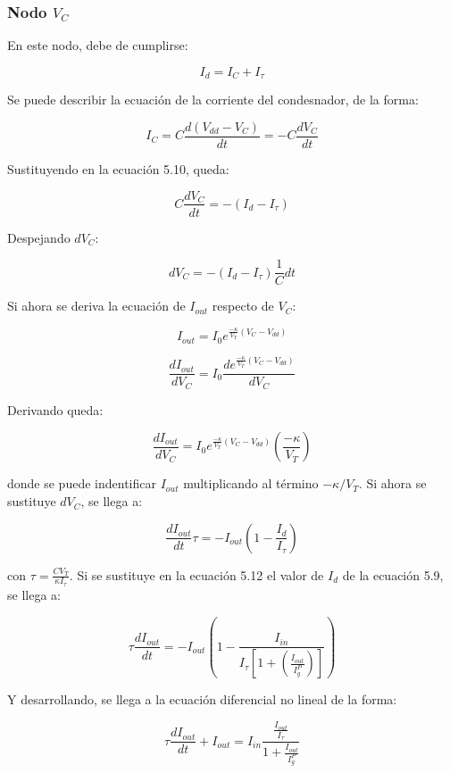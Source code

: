 \subsubsection{Nodo $V_C$}

En este nodo, debe de cumplirse:

\begin{equation}
I_d=I_C+I_\tau
\end{equation}

Se puede describir la ecuación de la corriente del condesnador, de la forma:

$$I_C=C\frac{d(V_{dd}-V_C)}{dt}=-C\frac{dV_C}{dt}$$

Sustituyendo en la ecuación 5.10, queda:

\begin{equation}
C\frac{dV_C}{dt}=-(I_d-I_\tau)
\end{equation}

Despejando $dV_C$:

$$dV_C=-(I_d-I_\tau)\frac{1}{C}dt$$

Si ahora se deriva la ecuación de $I_{out}$ respecto de $V_C$:

$$I_{out}=I_0e^{\frac{-\kappa}{V_T}(V_C-V_{dd})}$$

$$\frac{dI_{out}}{dV_C}=I_0\frac{de^{\frac{-\kappa}{V_T}(V_C-V_{dd})}}{dV_C}$$

Derivando queda:

$$\frac{dI_{out}}{dV_C}=I_0e^{\frac{-\kappa}{V_T}(V_C-V_{dd})}(\frac{-\kappa}{V_T})$$

donde se puede indentificar $I_{out}$ multiplicando al término $-\kappa /V_T$. Si ahora se sustituye $dV_C$, se llega a:

\begin{equation}
\frac{dI_{out}}{dt}\tau=-I_{out}(1-\frac{I_d}{I_{\tau}})
\end{equation}

con $\tau=\frac{CV_T}{\kappa I_{\tau}}$. Si se sustituye en la ecuación 5.12 el valor de $I_d$ de la ecuación 5.9, se llega a:

$$\tau \frac{dI_{out}}{dt}=-I_{out}(1-\frac{I_{in}}{I_{\tau}[1+(\frac{I_{out}}{I_g^P})]})$$

Y desarrollando, se llega a la ecuación diferencial no lineal de la forma:

\begin{equation}
\tau \frac{dI_{out}}{dt}+I_{out}=I_{in}\frac{\frac{I_{out}}{I_{\tau}}}{1+\frac{I_{out}}{I_g^P}}
\end{equation}

